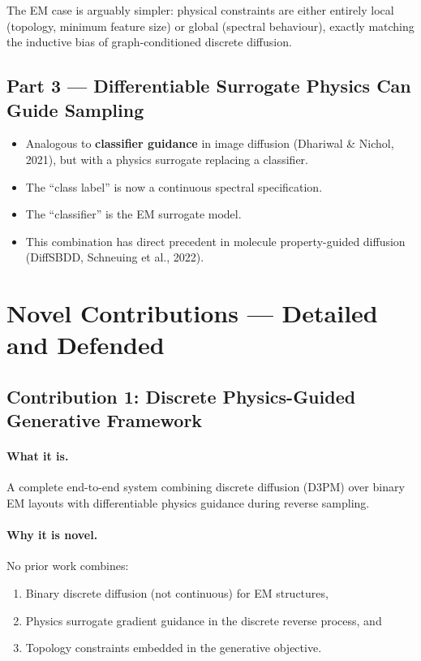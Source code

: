 \documentclass[12pt,a4paper]{article}
\theoremstyle{definition}
\theoremstyle{plain}
\theoremstyle{remark}
\begin{document}
The EM case is arguably simpler: physical constraints are either entirely local
(topology, minimum feature size) or global (spectral behaviour), exactly matching the
inductive bias of graph-conditioned discrete diffusion.

\subsection{Part 3 — Differentiable Surrogate Physics Can Guide Sampling}

\begin{itemize}
  \item Analogous to \textbf{classifier guidance} in image diffusion
        (Dhariwal \& Nichol, 2021), but with a physics surrogate replacing a classifier.
  \item The ``class label'' is now a continuous spectral specification.
  \item The ``classifier'' is the EM surrogate model.
  \item This combination has direct precedent in molecule property-guided diffusion
        (DiffSBDD, Schneuing et al., 2022).
\end{itemize}

\section{Novel Contributions — Detailed and Defended}
\label{sec:contributions}

\subsection{Contribution 1: Discrete Physics-Guided Generative Framework}

\paragraph{What it is.}
A complete end-to-end system combining discrete diffusion (D3PM) over binary EM layouts
with differentiable physics guidance during reverse sampling.

\paragraph{Why it is novel.}
No prior work combines:
\begin{enumerate}
  \item Binary discrete diffusion (not continuous) for EM structures,
  \item Physics surrogate gradient guidance in the discrete reverse process, and
  \item Topology constraints embedded in the generative objective.
\end{enumerate}
\end{document}
